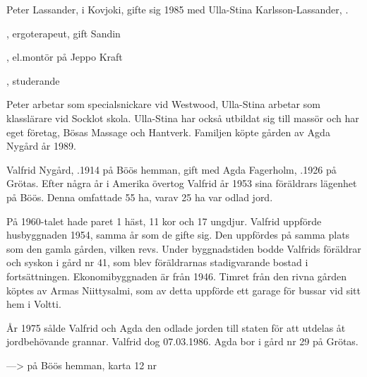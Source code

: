 
Peter Lassander,  i Kovjoki, gifte sig 1985 med Ulla-Stina Karlsson-Lassander, .
\begin{jhchildren}
  \item {}, ergoterapeut, gift Sandin
  \item {}, el.montör på Jeppo Kraft
  \item {}, studerande
\end{jhchildren}


Peter arbetar som specialsnickare vid Westwood, Ulla-Stina arbetar som klasslärare vid Socklot skola. Ulla-Stina har också utbildat sig till massör och har eget företag, Bösas Massage och Hantverk. Familjen köpte gården av Agda Nygård år 1989.


Valfrid Nygård, .1914 på Böös hemman, gift med Agda Fagerholm, .1926 på Grötas. Efter några år i Amerika övertog Valfrid år 1953 sina föräldrars lägenhet på Böös. Denna omfattade 55 ha, varav 25 ha var odlad jord.

På 1960-talet hade paret 1 häst, 11 kor och 17 ungdjur. Valfrid uppförde husbyggnaden 1954, samma år som de gifte sig. Den uppfördes på samma plats som den gamla gården, vilken revs. Under byggnadstiden bodde Valfrids föräldrar och syskon i gård nr 41, som blev föräldrarnas stadigvarande bostad i fortsättningen. Ekonomibyggnaden är från 1946. Timret från den rivna gården köptes av Armas Niittysalmi, som av detta uppförde ett garage för bussar vid sitt hem i Voltti.

År 1975 sålde Valfrid och Agda den odlade jorden till staten för att utdelas åt jordbehövande grannar. Valfrid dog 07.03.1986. Agda bor i gård nr 29 på Grötas.


--->  på Böös hemman, karta 12 nr 



